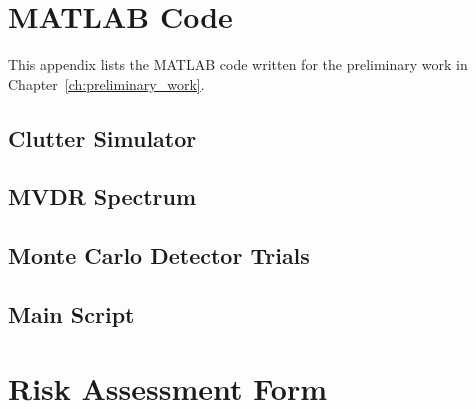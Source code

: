\appendix
\chapter{MATLAB Code}\label{app:code}
This appendix lists the MATLAB code written for the preliminary work in Chapter~\ref{ch:preliminary_work}.

\section{Clutter Simulator}\label{app:gen_clutter}
{\linespread{1}\selectfont}

\section{MVDR Spectrum}\label{app:mvdr}
{\linespread{1}\selectfont}

\section{Monte Carlo Detector Trials}\label{app:run_trials}
{\linespread{1}\selectfont}

\section{Main Script}\label{app:main}
{\linespread{1}\selectfont}

\chapter{Risk Assessment Form}\label{app:risk_assessment}